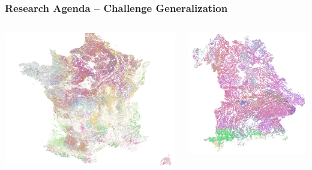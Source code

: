 \documentclass[%
  aspectratio=169,
  9pt,
  USenglish,
  titlegraphic, %
  affiliationintitlepagehead,
  progressbar,
]{beamer}
\begin{document}
\begin{frame}

\frametitle{Research Agenda -- Challenge Generalization}

\begin{columns}
	
	\includegraphics[width=.9\textwidth]{images/France}
	
	
	\includegraphics[width=.8\textwidth]{images/Bavaria}
\end{columns}

\end{frame}
\end{document}
